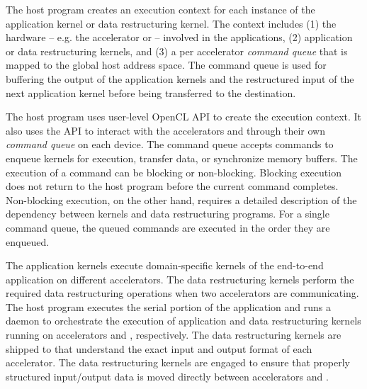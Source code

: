 The host program creates an execution context for each instance of the application kernel or data restructuring kernel. The context includes (1) the hardware -- e.g. the accelerator or \drx -- involved in the applications, (2) application or data restructuring kernels, and (3) a per accelerator \textit{command queue} that is mapped to the global host address space. The command queue is used for buffering the output of the application kernels and the restructured input of the next application kernel before being transferred to the destination.

The host program uses user-level OpenCL API to create the execution context. 
%
It also uses the API to interact with the accelerators and \drxs through their own \textit{command queue} on each device. 
%
The command queue accepts commands to enqueue kernels for execution, transfer data, or synchronize memory buffers. %
%
The execution of a command can be blocking or non-blocking. 
%
Blocking execution does not return to the host program before the current command completes. 
%
Non-blocking execution, on the other hand, requires a detailed description of the dependency between kernels and data restructuring programs. 
%
For a single command queue, the queued commands are executed in the order they are enqueued.

%
The application kernels execute domain-specific kernels of the end-to-end application on different accelerators. 
The data restructuring kernels perform the required data restructuring operations when two accelerators are communicating. The host program executes the serial portion of the application and runs a daemon to orchestrate the execution of application and data restructuring kernels running on accelerators and \drxs, respectively. 
%
%
The data restructuring kernels are shipped to \drxs that understand the exact input and output format of each accelerator. The data restructuring kernels are engaged to ensure that properly structured input/output data is moved directly between accelerators and \drx.


